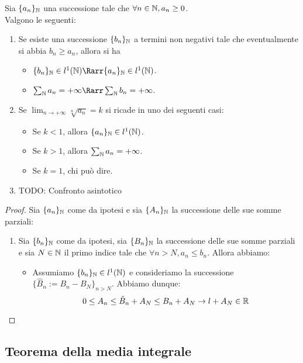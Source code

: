 \documentclass{article}
\begin{document}
\begin{theorem}{}{}
    Sia $\{a_n\}_{\mathbb{N}}$ una successione tale che $\forall n \in \mathbb{N}, a_n \ge 0$.\\
    Valgono le seguenti: \begin{enumerate}
        \item Se esiste una successione $\{b_n\}_{\mathbb{N}}$ a termini non negativi tale che eventualmente si abbia $b_n \ge a_n$, allora si ha \begin{itemize}
            \item $\{b_n\}_\N \in l^1(\N) \Rarr \{a_n\}_\N \in l^1(\N)$.
            \item $\sum_\N a_n = +\infty \Rarr \sum_\N b_n = +\infty$.
        \end{itemize}
        \item Se $\lim_{n\to+\infty} \sqrt[n]{a_n} = k$ si ricade in uno dei seguenti casi: \begin{itemize}
            \item Se $k<1$, allora $\{a_n\}_{\mathbb{N}} \in l^1(\mathbb{N})$.
            \item Se $k>1$, allora $\sum_{\mathbb{N}} a_n = +\infty$.
            \item Se $k=1$, chi può dire.
        \end{itemize}
        \item TODO: Confronto asintotico
    \end{enumerate}
\end{theorem}{}{}
\begin{proof}
    Sia $\{a_n\}_{\mathbb{N}}$ come da ipotesi e sia $\{A_n\}_{\mathbb{N}}$ la successione delle sue somme parziali:\begin{enumerate}
        \item Sia $\{b_n\}_{\mathbb{N}}$ come da ipotesi, sia $\{B_n\}_{\mathbb{N}}$ la successione delle sue somme parziali e sia $N \in \mathbb{N}$ il primo indice tale che $\forall n>N, a_n\le b_n$. Allora abbiamo:\begin{itemize}
            \item Assumiamo $\{b_n\}_{\mathbb{N}} \in l^1(\mathbb{N})$ e consideriamo la successione $\{\hat{B}_n := B_n - B_N\}_{n>N}$. Abbiamo dunque:
            \[0\le A_n \le \hat{B}_n + A_N \le B_n + A_N \to l + A_N \in \mathbb{R}\]
        \end{itemize}
    \end{enumerate}
\end{proof}

\subsection{Teorema della media integrale}
\end{document}
